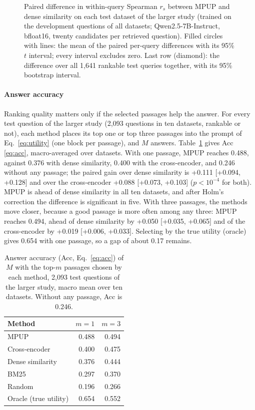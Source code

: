 \documentclass[conference]{IEEEtran}
\begin{document}
\begin{figure}[htbp]
    \centering
    \resizebox{\columnwidth}{!}{}
    \caption{Paired difference in within-query Spearman $r_s$ between MPUP and dense similarity on each test dataset of the larger study (trained on the development questions of all datasets; Qwen2.5-7B-Instruct, bfloat16, twenty candidates per retrieved question). Filled circles with lines: the mean of the paired per-query differences with its 95\% $t$ interval; every interval excludes zero. Last row (diamond): the difference over all 1,641 rankable test queries together, with its 95\% bootstrap interval.}
    \label{fig:forest}
\end{figure}

\paragraph{Answer accuracy} Ranking quality matters only if the selected passages help the answer. For every test question of the larger study (2,093 questions in ten datasets, rankable or not), each method places its top one or top three passages into the prompt of Eq.~\eqref{eq:utility} (one block per passage), and $M$ answers. Table~\ref{tab:answer} gives Acc \eqref{eq:acc}, macro-averaged over datasets. With one passage, MPUP reaches 0.488, against 0.376 with dense similarity, 0.400 with the cross-encoder, and 0.246 without any passage; the paired gain over dense similarity is +0.111 [+0.094, +0.128] and over the cross-encoder +0.088 [+0.073, +0.103] ($p < 10^{-4}$ for both). MPUP is ahead of dense similarity in all ten datasets, and after Holm's correction the difference is significant in five. With three passages, the methods move closer, because a good passage is more often among any three: MPUP reaches 0.494, ahead of dense similarity by +0.050 [+0.035, +0.065] and of the cross-encoder by +0.019 [+0.006, +0.033]. Selecting by the true utility (oracle) gives 0.654 with one passage, so a gap of about 0.17 remains.

\begin{table}[htbp]
    \centering
    \caption{Answer accuracy (Acc, Eq.~\eqref{eq:acc}) of $M$ with the top-$m$ passages chosen by each method, 2,093 test questions of the larger study, macro mean over ten datasets. Without any passage, Acc is 0.246.}
    \label{tab:answer}
    \footnotesize
    \begin{tabular}{lrr}
        \toprule
        \textbf{Method} & \textbf{$m=1$} & \textbf{$m=3$} \\
        \midrule
        MPUP & 0.488 & 0.494 \\
        Cross-encoder & 0.400 & 0.475 \\
        Dense similarity & 0.376 & 0.444 \\
        BM25 & 0.297 & 0.370 \\
        Random & 0.196 & 0.266 \\
        \midrule
        Oracle (true utility) & 0.654 & 0.552 \\
        \bottomrule
    \end{tabular}
\end{table}
\end{document}

